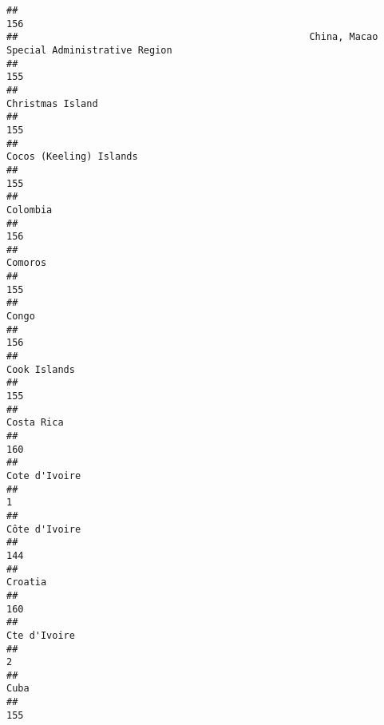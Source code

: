 \documentclass[]{article}
\begin{document}
\begin{verbatim}
##                                                                                          156 
##                                                   China, Macao Special Administrative Region 
##                                                                                          155 
##                                                                             Christmas Island 
##                                                                                          155 
##                                                                      Cocos (Keeling) Islands 
##                                                                                          155 
##                                                                                     Colombia 
##                                                                                          156 
##                                                                                      Comoros 
##                                                                                          155 
##                                                                                        Congo 
##                                                                                          156 
##                                                                                 Cook Islands 
##                                                                                          155 
##                                                                                   Costa Rica 
##                                                                                          160 
##                                                                                Cote d'Ivoire 
##                                                                                            1 
##                                                                                Côte d'Ivoire 
##                                                                                          144 
##                                                                                      Croatia 
##                                                                                          160 
##                                                                                Cte d'Ivoire 
##                                                                                            2 
##                                                                                         Cuba 
##                                                                                          155 

\end{verbatim}
\end{document}
